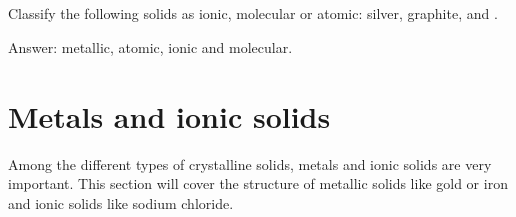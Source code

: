 \documentclass[main.tex]{subfiles}
\newcommand\chapterlabel{solids}
\begin{document}
\begin{description}
\begin{example}
\begin{tabularx}{\textwidth}{
    >{\centering}m{.185\linewidth} 
    *{4}{Y} }
    \bottomrule
\end{tabularx}
\\
\faDiamond\ \\
Classify the following solids as ionic, molecular or atomic: silver, graphite,  and .
\begin{flushright} Answer: metallic, atomic, ionic and molecular.\end{flushright}
\end{example}%

\end{description}
\newpage


\section{Metals and ionic solids}
Among the different types of crystalline solids, metals and ionic solids are very important. This section will cover the structure of metallic solids like gold or iron and ionic solids like sodium chloride.
     \label{Fig:{\chapterlabel}\thefigurenewcounter}
\end{document}
